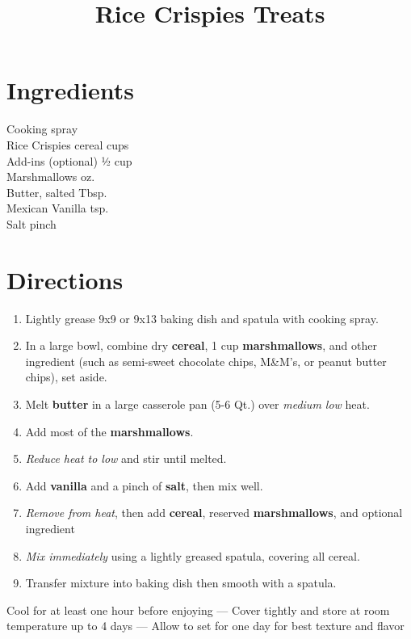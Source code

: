\documentclass[11pt,letterpaper]{article}
\title{Rice Crispies Treats}
\author{}
\date{}
\begin{document}
\maketitle
\thispagestyle{empty}

\section*{Ingredients}
\setlength{\columnsep}{20pt}
\begin{multicols}{2}
\noindent
	Cooking spray \dotfill \\
	Rice Crispies cereal  cups \\
	Add-ins (optional) \dotfill ½ cup \\
	Marshmallows  oz. \\
	Butter, salted  Tbsp. \\
	Mexican Vanilla  tsp. \\
	Salt \dotfill pinch \\

\end{multicols}

\section*{Directions}

\begin{enumerate}
	\item Lightly grease 9x9 or 9x13 baking dish and spatula with cooking spray.
	\item In a large bowl, combine dry \textbf{cereal}, 1 cup \textbf{marshmallows}, and other ingredient (such as semi-sweet chocolate chips, M\&M's, or peanut butter chips), set aside.
	\item Melt \textbf{butter} in a large casserole pan (5-6 Qt.) over \textit{medium low} heat.
	\item Add most of the \textbf{marshmallows}.
	\item \textit{Reduce heat to low} and stir until melted.
	\item Add \textbf{vanilla} and a pinch of \textbf{salt}, then mix well.
	\item \textit{Remove from heat}, then add \textbf{cereal}, reserved \textbf{marshmallows}, and optional ingredient
	\item \textit{Mix immediately} using a lightly greased spatula, covering all cereal.
	\item Transfer mixture into baking dish then smooth with a spatula.
\end{enumerate}

Cool for at least one hour before enjoying ---
Cover tightly and store at room temperature up to 4 days ---
Allow to set for one day for best texture and flavor
\end{document}
